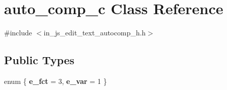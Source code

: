 \section{auto\+\_\+comp\+\_\+c Class Reference}
\label{classauto__comp__c}


{\ttfamily \#include $<$in\+\_\+js\+\_\+edit\+\_\+text\+\_\+autocomp\+\_\+h.\+h$>$}

\subsection*{Public Types}
\begin{DoxyCompactItemize}
\item 
\mbox{\label{classauto__comp__c_adf764cbdea00d65edcd07bb9953ad2b7}} 
enum \{ {\bfseries e\+\_\+fct} = 3, 
{\bfseries e\+\_\+var} = 1
 \}
\end{DoxyCompactItemize}
